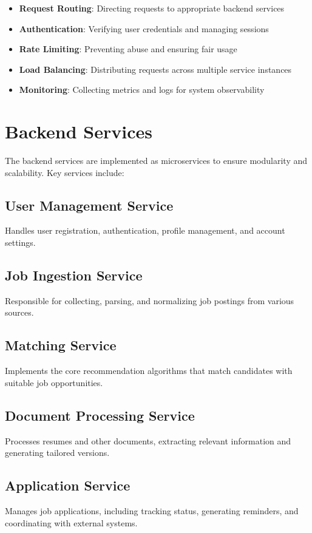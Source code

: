 \documentclass[12pt,a4paper]{report}
\begin{document}
\begin{itemize}[leftmargin=2em]
  \item \textbf{Request Routing}: Directing requests to appropriate backend services
  \item \textbf{Authentication}: Verifying user credentials and managing sessions
  \item \textbf{Rate Limiting}: Preventing abuse and ensuring fair usage
  \item \textbf{Load Balancing}: Distributing requests across multiple service instances
  \item \textbf{Monitoring}: Collecting metrics and logs for system observability
\end{itemize}

\section{Backend Services}
The backend services are implemented as microservices to ensure modularity and scalability. Key services include:

\subsection{User Management Service}
Handles user registration, authentication, profile management, and account settings.

\subsection{Job Ingestion Service}
Responsible for collecting, parsing, and normalizing job postings from various sources.

\subsection{Matching Service}
Implements the core recommendation algorithms that match candidates with suitable job opportunities.

\subsection{Document Processing Service}
Processes resumes and other documents, extracting relevant information and generating tailored versions.

\subsection{Application Service}
Manages job applications, including tracking status, generating reminders, and coordinating with external systems.
\end{document}
